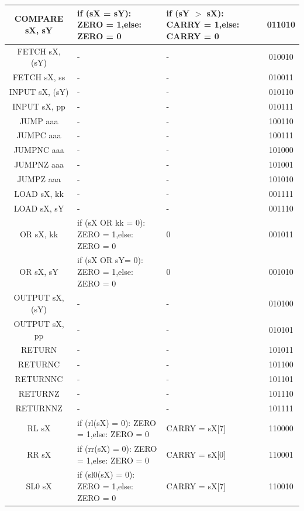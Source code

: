 \documentclass[bibliography=totoc,listof=totoc,index=totoc]{scrartcl}
\begin{document}
\begin{small}
\begin{longtable}{||c|p{6cm}|p{6cm}|c||}
    COMPARE sX, sY & if (sX = sY): ZERO = 1,\newline else: ZERO = 0
    & if (sY $>$ sX): CARRY = 1,\newline else: CARRY = 0 & 011010 \\ \hline
    FETCH sX, (sY) & - & - & 010010 \\ \hline
    FETCH sX, ss & - & - & 010011 \\ \hline
    INPUT sX, (sY) & - & - & 010110 \\ \hline
    INPUT sX, pp & - & - & 010111 \\ \hline
    JUMP aaa & - & - & 100110 \\ \hline
    JUMPC aaa & - & - & 100111 \\ \hline
    JUMPNC aaa & - & - & 101000 \\ \hline
    JUMPNZ aaa & - & - & 101001 \\ \hline
    JUMPZ aaa & - & - & 101010 \\ \hline 
    LOAD sX, kk & - & - & 001111 \\ \hline
    LOAD sX, sY & - & - & 001110 \\ \hline 
    OR sX, kk & if (sX OR kk = 0): ZERO = 1,\newline else: ZERO = 0 & 0 & 001011 \\ \hline
    OR sX, sY & if (sX OR sY= 0): ZERO = 1,\newline else: ZERO = 0 & 0 & 001010 \\ \hline
    OUTPUT sX, (sY) & - & - & 010100 \\ \hline
    OUTPUT sX, pp & - & - & 010101 \\ \hline
    RETURN & - & - & 101011 \\ \hline
    RETURNC & - & - & 101100 \\ \hline
    RETURNNC & - & - & 101101 \\ \hline
    RETURNZ & - & - & 101110 \\ \hline
    RETURNNZ & - & - & 101111 \\ \hline
    RL sX & if (rl(sX) = 0): ZERO = 1,\newline else: ZERO = 0
    & CARRY = sX[7] & 110000 \\ \hline
    RR sX & if (rr(sX) = 0): ZERO = 1,\newline else: ZERO = 0
    & CARRY = sX[0] & 110001 \\ \hline
    SL0 sX & if (sl0(sX) = 0): ZERO = 1,\newline else: ZERO = 0
    & CARRY = sX[7] & 110010 \\ \hline

\end{longtable}
\end{small}
\end{document}
